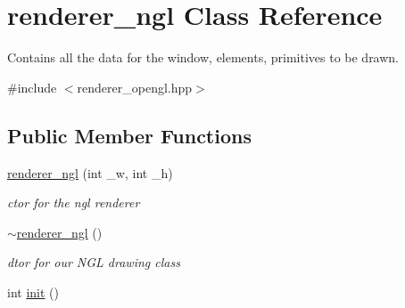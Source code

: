 \hypertarget{classrenderer__ngl}{\section{renderer\-\_\-ngl Class Reference}
\label{classrenderer__ngl}
}


Contains all the data for the window, elements, primitives to be drawn.  




{\ttfamily \#include $<$renderer\-\_\-opengl.\-hpp$>$}

\subsection*{Public Member Functions}
\begin{DoxyCompactItemize}
\item 
\hyperlink{classrenderer__ngl_a2c599a4e6f5c39cdaadbd888a9b10c4f}{renderer\-\_\-ngl} (int \-\_\-w, int \-\_\-h)
\begin{DoxyCompactList}\small\item\em ctor for the ngl renderer \end{DoxyCompactList}\item 
\hypertarget{classrenderer__ngl_a5591cac62e43ce26545d489e91386a11}{\hyperlink{classrenderer__ngl_a5591cac62e43ce26545d489e91386a11}{$\sim$renderer\-\_\-ngl} ()}\label{classrenderer__ngl_a5591cac62e43ce26545d489e91386a11}

\begin{DoxyCompactList}\small\item\em dtor for our N\-G\-L drawing class \end{DoxyCompactList}\item 
\hypertarget{classrenderer__ngl_a7e355871e6c9537aee3c3ed76f12f9d0}{int \hyperlink{classrenderer__ngl_a7e355871e6c9537aee3c3ed76f12f9d0}{init} ()}\label{classrenderer__ngl_a7e355871e6c9537aee3c3ed76f12f9d0}


\end{DoxyCompactItemize}
